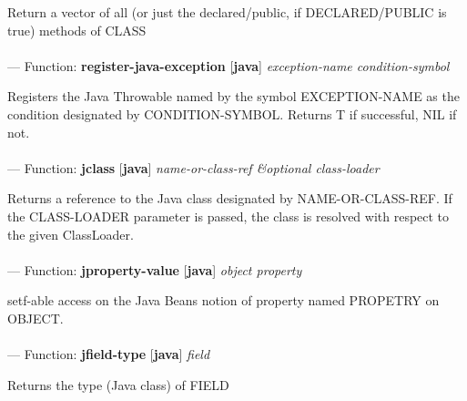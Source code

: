 \begin{adjustwidth}{5em}{5em}
Return a vector of all (or just the declared/public, if DECLARED/PUBLIC is true) methods of CLASS
\end{adjustwidth}

\paragraph{}
\label{JAVA:REGISTER-JAVA-EXCEPTION}
--- Function: \textbf{register-java-exception} [\textbf{java}] \textit{exception-name condition-symbol}

\begin{adjustwidth}{5em}{5em}
Registers the Java Throwable named by the symbol EXCEPTION-NAME as the condition designated by CONDITION-SYMBOL.  Returns T if successful, NIL if not.
\end{adjustwidth}

\paragraph{}
\label{JAVA:JCLASS}
--- Function: \textbf{jclass} [\textbf{java}] \textit{name-or-class-ref \&optional class-loader}

\begin{adjustwidth}{5em}{5em}
Returns a reference to the Java class designated by NAME-OR-CLASS-REF. If the CLASS-LOADER parameter is passed, the class is resolved with respect to the given ClassLoader.
\end{adjustwidth}

\paragraph{}
\label{JAVA:JPROPERTY-VALUE}
--- Function: \textbf{jproperty-value} [\textbf{java}] \textit{object property}

\begin{adjustwidth}{5em}{5em}
setf-able access on the Java Beans notion of property named PROPETRY on OBJECT.
\end{adjustwidth}

\paragraph{}
\label{JAVA:JFIELD-TYPE}
--- Function: \textbf{jfield-type} [\textbf{java}] \textit{field}

\begin{adjustwidth}{5em}{5em}
Returns the type (Java class) of FIELD
\end{adjustwidth}

